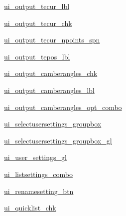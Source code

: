 \begin{DoxyCompactItemize}
\item 
\hyperlink{classbladepro__modules_1_1inputfile__writer_u_i_1_1_ui___main_window_af6b3a50b9ed8b101a02f8cd2103add7a}{ui\+\_\+output\+\_\+tecur\+\_\+lbl}
\item 
\hyperlink{classbladepro__modules_1_1inputfile__writer_u_i_1_1_ui___main_window_a8a199146fc853fdada7f050f108a22a2}{ui\+\_\+output\+\_\+tecur\+\_\+chk}
\item 
\hyperlink{classbladepro__modules_1_1inputfile__writer_u_i_1_1_ui___main_window_aec9a2b9c0199fa892631d906b1296a13}{ui\+\_\+output\+\_\+tecur\+\_\+npoints\+\_\+spn}
\item 
\hyperlink{classbladepro__modules_1_1inputfile__writer_u_i_1_1_ui___main_window_a0906e6ac9dd29621615af0e54f1b2768}{ui\+\_\+output\+\_\+tepos\+\_\+lbl}
\item 
\hyperlink{classbladepro__modules_1_1inputfile__writer_u_i_1_1_ui___main_window_a6250f7ec5670033a6994818abf3d9b15}{ui\+\_\+output\+\_\+camberangles\+\_\+chk}
\item 
\hyperlink{classbladepro__modules_1_1inputfile__writer_u_i_1_1_ui___main_window_ae0b09533ea5d38dcba89c010fcdc7886}{ui\+\_\+output\+\_\+camberangles\+\_\+lbl}
\item 
\hyperlink{classbladepro__modules_1_1inputfile__writer_u_i_1_1_ui___main_window_a8c262e36d39977da647517cb97b7ab86}{ui\+\_\+output\+\_\+camberangles\+\_\+opt\+\_\+combo}
\item 
\hyperlink{classbladepro__modules_1_1inputfile__writer_u_i_1_1_ui___main_window_a868061df5f5e844caea1728de203129e}{ui\+\_\+selectusersettings\+\_\+groupbox}
\item 
\hyperlink{classbladepro__modules_1_1inputfile__writer_u_i_1_1_ui___main_window_a5a42530f0dd7f8e7c2da3074565220be}{ui\+\_\+selectusersettings\+\_\+groupbox\+\_\+gl}
\item 
\hyperlink{classbladepro__modules_1_1inputfile__writer_u_i_1_1_ui___main_window_aa064aa43c06b096e6d2753909fddf376}{ui\+\_\+user\+\_\+settings\+\_\+gl}
\item 
\hyperlink{classbladepro__modules_1_1inputfile__writer_u_i_1_1_ui___main_window_a1ac2324eaa26fdc7d7a038b7df328a0d}{ui\+\_\+listsettings\+\_\+combo}
\item 
\hyperlink{classbladepro__modules_1_1inputfile__writer_u_i_1_1_ui___main_window_a720608a6cc8575e078cd4e807dfe1031}{ui\+\_\+renamesetting\+\_\+btn}
\item 
\hyperlink{classbladepro__modules_1_1inputfile__writer_u_i_1_1_ui___main_window_af95ad0699234293c4dbeaa2fbf3af607}{ui\+\_\+quicklist\+\_\+chk}

\end{DoxyCompactItemize}
